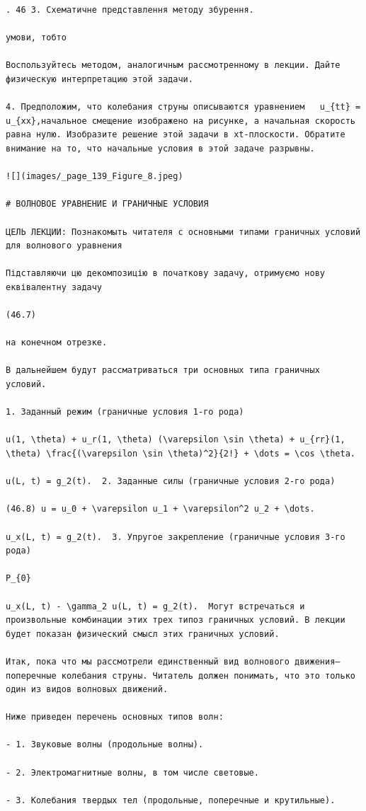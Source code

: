 \documentclass[
  ukrainian,
]{article}
\begin{document}
\begin{verbatim}
. 46 3. Схематичне представлення методу збурення.

умови, тобто

Воспользуйтесь методом, аналогичным рассмотренному в лекции. Дайте физическую интерпретацию этой задачи.

4. Предположим, что колебания струны описываются уравнением   u_{tt} = u_{xx},начальное смещение изображено на рисунке, а начальная скорость равна нулю. Изобразите решение этой задачи в xt-плоскости. Обратите внимание на то, что начальные условия в этой задаче разрывны.

![](images/_page_139_Figure_8.jpeg)

# ВОЛНОВОЕ УРАВНЕНИЕ И ГРАНИЧНЫЕ УСЛОВИЯ

ЦЕЛЬ ЛЕКЦИИ: Познакомыть читателя с основными типами граничных условий для волнового уравнения

Підставляючи цю декомпозицію в початкову задачу, отримуємо нову еквівалентну задачу

(46.7)

на конечном отрезке.

В дальнейшем будут рассматриваться три основных типа граничных условий.

1. Заданный режим (граничные условия 1-го рода)

u(1, \theta) + u_r(1, \theta) (\varepsilon \sin \theta) + u_{rr}(1, \theta) \frac{(\varepsilon \sin \theta)^2}{2!} + \dots = \cos \theta.

u(L, t) = g_2(t).  2. Заданные силы (граничные условия 2-го рода)

(46.8) u = u_0 + \varepsilon u_1 + \varepsilon^2 u_2 + \dots.

u_x(L, t) = g_2(t).  3. Упругое закрепление (граничные условия 3-го рода)

P_{0}

u_x(L, t) - \gamma_2 u(L, t) = g_2(t).  Могут встречаться и произвольные комбинации этих трех типоз граничных условий. В лекции будет показан физический смысл этих граничных условий.

Итак, пока что мы рассмотрели единственный вид волнового движения—поперечные колебания струны. Читатель должен понимать, что это только один из видов волновых движений.

Ниже приведен перечень основных типов волн:

- 1. Звуковые волны (продольные волны).

- 2. Электромагнитные волны, в том числе световые.

- 3. Колебания твердых тел (продольные, поперечные и крутильные).


\end{verbatim}
\end{document}
